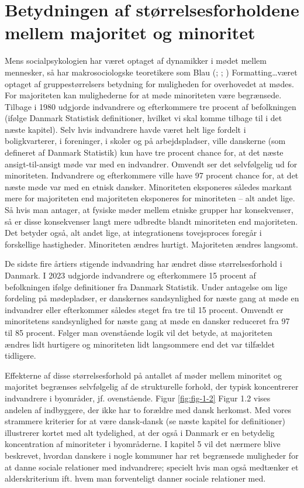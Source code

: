 \documentclass[
]{book}
\begin{document}
\section{Betydningen af størrelsesforholdene mellem majoritet og minoritet}\label{betydningen-af-stuxf8rrelsesforholdene-mellem-majoritet-og-minoritet}

Mens socialpsykologien har været optaget af dynamikker i mødet mellem mennesker, så har makrosociologske teoretikere som Blau (; ; ) Formatting\ldots været optaget af gruppestørrelsers betydning for muligheden for overhovedet at mødes. For majoriteten kan mulighederne for at møde minoriteten være begrænsede. Tilbage i 1980 udgjorde indvandrere og efterkommere tre procent af befolkningen (ifølge Danmark Statistisk definitioner, hvilket vi skal komme tilbage til i det næste kapitel). Selv hvis indvandrere havde været helt lige fordelt i boligkvarterer, i foreninger, i skoler og på arbejdspladser, ville danskerne (som defineret af Danmark Statistik) kun have tre procent chance for, at det næste ansigt-til-ansigt møde var med en indvandrer. Omvendt ser det selvfølgelig ud for minoriteten. Indvandrere og efterkommere ville have 97 procent chance for, at det næste møde var med en etnisk dansker. Minoriteten eksponeres således markant mere for majoriteten end majoriteten eksponeres for minoriteten -- alt andet lige. Så hvis man antager, at fysiske møder mellem etniske grupper har konsekvenser, så er disse konsekvenser langt mere udbredte blandt minoriteten end majoriteten. Det betyder også, alt andet lige, at integrationens tovejsproces foregår i forskellige hastigheder. Minoriteten ændres hurtigt. Majoriteten ændres langsomt.

De sidste fire årtiers stigende indvandring har ændret disse størrelsesforhold i Danmark. I 2023 udgjorde indvandrere og efterkommere 15 procent af befolkningen ifølge definitioner fra Danmark Statistik. Under antagelse om lige fordeling på mødepladser, er danskernes sandsynlighed for næste gang at møde en indvandrer eller efterkommer således steget fra tre til 15 procent. Omvendt er minoritetens sandsynlighed for næste gang at møde en dansker reduceret fra 97 til 85 procent. Følger man ovenstående logik vil det betyde, at majoriteten ændres lidt hurtigere og minoriteten lidt langsommere end det var tilfældet tidligere.

Effekterne af disse størrelsesforhold på antallet af møder mellem minoritet og majoritet begrænses selvfølgelig af de strukturelle forhold, der typisk koncentrerer indvandrere i byområder, jf. ovenstående. Figur \ref{fig:fig-1-2} Figur 1.2 vises andelen af indbyggere, der ikke har to forældre med dansk herkomst. Med vores strammere kriterier for at være dansk-dansk (se næste kapitel for definitioner) illustrerer kortet med alt tydelighed, at der også i Danmark er en betydelig koncentration af minoriteter i byområderne. I kapitel 5 vil det nærmere blive beskrevet, hvordan danskere i nogle kommuner har ret begrænsede muligheder for at danne sociale relationer med indvandrere; specielt hvis man også medtænker et alderskriterium ift. hvem man forventeligt danner sociale relationer med.
\end{document}
